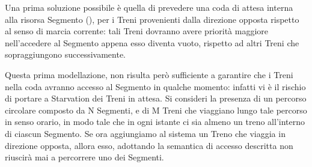 \begin{description}
			Una prima soluzione possibile è quella di prevedere una coda di attesa interna alla risorsa Segmento (), per i Treni provenienti dalla direzione opposta rispetto al senso di marcia corrente: tali Treni dovranno avere priorità maggiore nell'accedere al Segmento appena esso diventa vuoto, rispetto ad altri Treni che sopraggiungono successivamente.
			
			Questa prima modellazione, non risulta però sufficiente a garantire che i Treni nella coda avranno accesso al Segmento in qualche momento: infatti vi è il rischio di portare a Starvation dei Treni in attesa. Si consideri la presenza di un percorso circolare composto da N Segmenti, e di M Treni che viaggiano lungo tale percorso in senso orario, in modo tale che in ogni istante ci sia almeno un treno all'interno di ciascun Segmento. Se ora aggiungiamo al sistema un Treno che viaggia in direzione opposta, allora esso, adottando la semantica di accesso descritta non riuscirà mai a percorrere uno dei Segmenti.			
			
			

\end{description}
